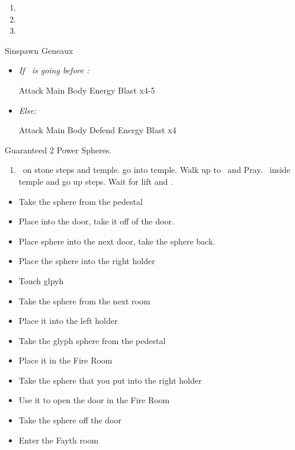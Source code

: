 \begin{enumerate}[resume]
	\item \sd
	\item \formation{\tidus}{\yuna}{\wakka}
	\item \save
\end{enumerate}
\bothvfill\winvfill\lossvfill
\begin{battle}[3000]{Sinspawn Geneaux}
	\begin{itemize}
		\item \textit{If \tidus\ is going before \yuna:}
		      \begin{itemize}
			      \tidusf Attack Main Body
			      \summon{\valefor}
			      \valeforf Energy Blast \od
			      \valeforf \fire x4-5
		      \end{itemize}
		\item \textit{Else:}
		      \begin{itemize}
			      \switch{\yuna}{\kimahri}
			      \kimahrif Attack Main Body
			      \tidusf Defend
			      \switch{anyone}{\yuna}
			      \summon{\valefor}
			      \valeforf Energy Blast \od
			      \valeforf \fire x4
		      \end{itemize}
	\end{itemize}
Guaranteed 2 Power Spheres.
\end{battle}
\begin{enumerate}[resume]
	\item \sd\ on stone steps and temple. go into temple. Walk up to \wakka\ and Pray. \sd\ inside temple and go up steps. Wait for lift and \sd.
\end{enumerate}
\begin{trial}
	\begin{itemize}
		\item Take the sphere from the pedestal
		\item Place into the door, take it off of the door.
		\item Place sphere into the next door, take the sphere back.
		\item Place the sphere into the right holder
		\item Touch glpyh
		\item Take the sphere from the next room
		\item Place it into the left holder
		\item Take the glyph sphere from the pedestal
		\item Place it in the Fire Room
		\item Take the sphere that you put into the right holder
		\item Use it to open the door in the Fire Room
		\item Take the sphere off the door
		\item Enter the Fayth room
	\end{itemize}
\end{trial}
